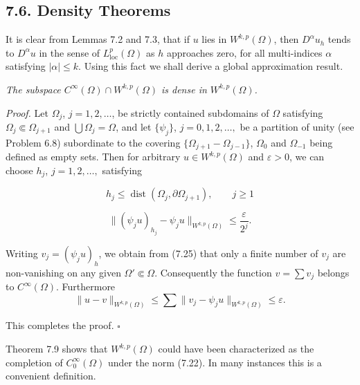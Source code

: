 \subsection*{7.6. Density Theorems}

It is clear from Lemmas 7.2 and 7.3, that if $u$ lies in $W^{k,p}(\Omega)$, then $D^{\alpha}u_{h}$ tends to
$D^{\alpha}u$ in the sense of $L^{p}_{\mathrm{loc}}(\Omega)$ as $h$ approaches zero, for all multi-indices $\alpha$ satisfying
$|\alpha|\le k$. Using this fact we shall derive a global approximation result.

\begin{theorem}\label{gt:thm-sobolev-density-smooth}
\emph{The subspace $C^{\infty}(\Omega)\cap W^{k,p}(\Omega)$ is dense in $W^{k,p}(\Omega)$.}
\end{theorem}

\emph{Proof.} Let $\Omega_{j}$, $j=1,2,\ldots$, be strictly contained subdomains of $\Omega$ satisfying
$\Omega_{j}\Subset \Omega_{j+1}$ and $\bigcup \Omega_{j}=\Omega$, and let $\{\psi_{j}\}$, $j=0,1,2,\ldots,$ be a partition of unity
(see Problem 6.8) subordinate to the covering $\{\Omega_{j+1}-\Omega_{j-1}\}$, $\Omega_{0}$ and $\Omega_{-1}$ being
defined as empty sets. Then for arbitrary $u\in W^{k,p}(\Omega)$ and $\varepsilon>0$, we can choose
$h_{j}$, $j=1,2,\ldots,$ satisfying

\begin{equation}
\tag{7.25}
h_{j}\le \operatorname{dist}(\Omega_{j},\partial\Omega_{j+1}), \qquad j\ge 1
\end{equation}

\[
\|(\psi_{j}u)_{h_{j}}-\psi_{j}u\|_{W^{k,p}(\Omega)}\le \frac{\varepsilon}{2^{j}}.
\]


Writing $v_j=(\psi_j u)_h$, we obtain from (7.25) that only a finite number of $v_j$ are non-vanishing on any given $\Omega' \Subset \Omega$. Consequently the function $v=\sum v_j$ belongs to $C^\infty(\Omega)$. Furthermore
\[
\|u-v\|_{W^{k,p}(\Omega)} \leq \sum \|v_j-\psi_j u\|_{W^{k,p}(\Omega)} \leq \varepsilon.
\]

This completes the proof. $\square$

Theorem 7.9 shows that $W^{k,p}(\Omega)$ could have been characterized as the completion of $C^\infty_0(\Omega)$ under the norm (7.22). In many instances this is a convenient definition.

